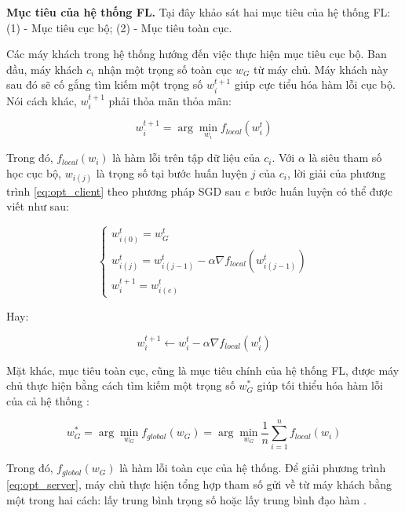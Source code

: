 \label{purpose_fl}
\textbf{Mục tiêu của hệ thống FL.} Tại đây khảo sát hai mục tiêu của hệ thống FL: (1) - Mục tiêu cục bộ; (2) - Mục tiêu toàn cục.

Các máy khách trong hệ thống hướng đến việc thực hiện mục tiêu cục bộ. Ban đầu, máy khách $c_i$ nhận một trọng số toàn cục $w_G$ từ máy chủ. Máy khách này sau đó sẽ cố gắng tìm kiếm một trọng số $w_i^{t+1}$ giúp cực tiểu hóa hàm lỗi cục bộ. Nói cách khác, $w_i^{t+1}$ phải thỏa mãn thỏa mãn:

\begin{equation}
    \label{eq:opt_client}
    w_i^{t+1} = \arg\min_{w_i}{f_{local}(w_i^t)}
\end{equation}

Trong đó, $f_{local}(w_i)$ là hàm lỗi trên tập dữ liệu của $c_i$. Với $\alpha$ là siêu tham số học cục bộ, $w_{i(j)}$ là trọng số tại bước huấn luyện $j$ của $c_i$, lời giải của phương trình \ref{eq:opt_client} theo phương pháp SGD sau $e$ bước huấn luyện có thể được viết như sau:

\begin{equation}
    \begin{cases}
        w_{i(0)}^t = w_G^t\\
        w_{i(j)}^t = w_{i(j-1)}^t - \alpha \nabla f_{local}(w_{i(j-1)}^t)\\
        w_i^{t+1} = w_{i(e)}^t
    \end{cases}
\end{equation}

Hay:

\begin{dmath}
    w_i^{t+1} \leftarrow w_i^t - \alpha\nabla f_{local}(w_i^t)
\end{dmath}

Mặt khác, mục tiêu toàn cục, cũng là mục tiêu chính của hệ thống FL, được máy chủ thực hiện bằng cách tìm kiếm một trọng số $w_G^*$ giúp tối thiểu hóa hàm lỗi của cả hệ thống \cite{yin2021comprehensive}:

\begin{dmath}
    \label{eq:opt_server}
    w_G^* = \arg \min_{w_G}{f_{global}(w_G)}
        = \arg \min_{w_G}{\frac{1}{n} \sum_{i=1}^n{f_{local}(w_i)}}
\end{dmath}

Trong đó, $f_{global}(w_G)$ là hàm lỗi toàn cục của hệ thống. Để giải phương trình \ref{eq:opt_server}, máy chủ thực hiện tổng hợp tham số gửi về từ máy khách bằng một trong hai cách: lấy trung bình trọng số \parencite{mcmahan2017communication, aono2017privacy, yoon2021fedmix} hoặc lấy trung bình đạo hàm \parencite{chen2018federated, mcmahan2017learning}.

